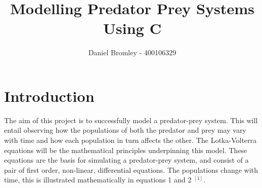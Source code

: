 \documentclass[11pt]{elsarticle}
\begin{document}
\begin{frontmatter}

\title{Modelling Predator Prey Systems Using C}

\author{Daniel Bromley - 400106329}

\address{PHYSICS 2G03: Scientific Computing}



\end{frontmatter}

\section*{Introduction}

The aim of this project is to successfully model a predator-prey system. This will entail observing how the populations of both the predator and prey may vary with time and how each population in turn affects the other. The Lotka-Volterra equations will be the mathematical principles underpinning this model. These equations are the basis for simulating a predator-prey system, and consist of a pair of first order, non-linear, differential equations. The populations change with time, this is illustrated mathematically in equations 1 and 2 $^{[1]}$.
\end{document}
